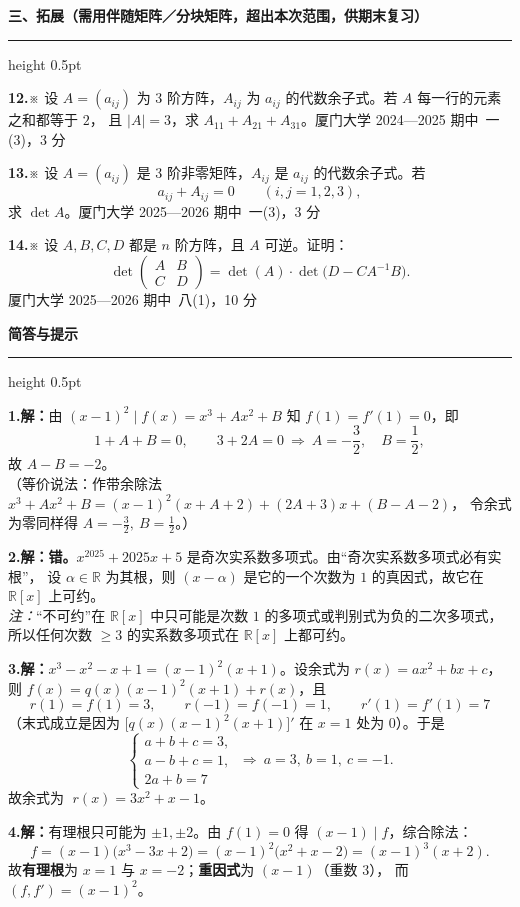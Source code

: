 ﻿\documentclass[11pt,a4paper,fontset=windows]{ctexart}
\newcommand{\src}[1]{\hfill{\small\color{hdgray}\songti #1}}
\newcommand{\sd}{\textbf{解：}}
\newcommand{\prob}[2]{\Needspace{5\baselineskip}\par\vspace{10pt}\noindent
  \textbf{#1}\hspace{0.4em}#2\par\vspace{3pt}}
\newcommand{\grp}[1]{\Needspace{9\baselineskip}\par\vspace{14pt}%
  {\large\bfseries\songti #1}\par\vspace{2pt}\hrule height 0.5pt\par\vspace{6pt}}
\begin{document}
\grp{三、拓展（需用伴随矩阵／分块矩阵，超出本次范围，供期末复习）}

\prob{12.}{※ 设 $A=(a_{ij})$ 为 3 阶方阵，$A_{ij}$ 为 $a_{ij}$ 的代数余子式。若 $A$ 每一行的元素之和都等于 $2$，
且 $|A|=3$，求 $A_{11}+A_{21}+A_{31}$。\src{厦门大学 2024—2025 期中\ 一(3)，3 分}}

\prob{13.}{※ 设 $A=(a_{ij})$ 是 3 阶非零矩阵，$A_{ij}$ 是 $a_{ij}$ 的代数余子式。若
\[
a_{ij}+A_{ij}=0\qquad(i,j=1,2,3),
\]
求 $\det A$。\src{厦门大学 2025—2026 期中\ 一(3)，3 分}}

\prob{14.}{※ 设 $A,B,C,D$ 都是 $n$ 阶方阵，且 $A$ 可逆。证明：
\[
\det\begin{pmatrix}A&B\\[2pt]C&D\end{pmatrix}
=\det(A)\cdot\det\bigl(D-CA^{-1}B\bigr).
\]
\src{厦门大学 2025—2026 期中\ 八(1)，10 分}}

\newpage
\grp{简答与提示}

\prob{1.}{\sd 由 $(x-1)^{2}\mid f(x)=x^{3}+Ax^{2}+B$ 知 $f(1)=f'(1)=0$，即
\[
1+A+B=0,\qquad 3+2A=0\ \Longrightarrow\ A=-\frac32,\quad B=\frac12,
\]
故 $A-B=-2$。\\[2pt]
（等价说法：作带余除法 $x^{3}+Ax^{2}+B=(x-1)^{2}(x+A+2)+(2A+3)x+(B-A-2)$，
令余式为零同样得 $A=-\frac32,\ B=\frac12$。）}

\prob{2.}{\sd \textbf{错。}$x^{2025}+2025x+5$ 是奇次实系数多项式。由“奇次实系数多项式必有实根”，
设 $\alpha\in\mathbb{R}$ 为其根，则 $(x-\alpha)$ 是它的一个次数为 $1$ 的真因式，故它在 $\mathbb{R}[x]$ 上可约。
\\[2pt]
\emph{注：}“不可约”在 $\mathbb{R}[x]$ 中只可能是次数 $1$ 的多项式或判别式为负的二次多项式，
所以任何次数 $\ge3$ 的实系数多项式在 $\mathbb{R}[x]$ 上都可约。}

\prob{3.}{\sd $x^{3}-x^{2}-x+1=(x-1)^{2}(x+1)$。设余式为 $r(x)=ax^{2}+bx+c$，则
$f(x)=q(x)(x-1)^{2}(x+1)+r(x)$，且
\[
r(1)=f(1)=3,\qquad r(-1)=f(-1)=1,\qquad r'(1)=f'(1)=7
\]
（末式成立是因为 $\bigl[q(x)(x-1)^{2}(x+1)\bigr]'$ 在 $x=1$ 处为 $0$）。于是
\[
\begin{cases}a+b+c=3,\\ a-b+c=1,\\ 2a+b=7\end{cases}
\ \Longrightarrow\ a=3,\ b=1,\ c=-1 .
\]
故余式为 $\;r(x)=3x^{2}+x-1$。}

\prob{4.}{\sd 有理根只可能为 $\pm1,\pm2$。由 $f(1)=0$ 得 $(x-1)\mid f$，综合除法：
\[
f=(x-1)\bigl(x^{3}-3x+2\bigr)=(x-1)^{2}\bigl(x^{2}+x-2\bigr)=(x-1)^{3}(x+2).
\]
故\textbf{有理根}为 $x=1$ 与 $x=-2$；\textbf{重因式}为 $(x-1)$（重数 $3$），
而 $(f,f')=(x-1)^{2}$。}
\end{document}
